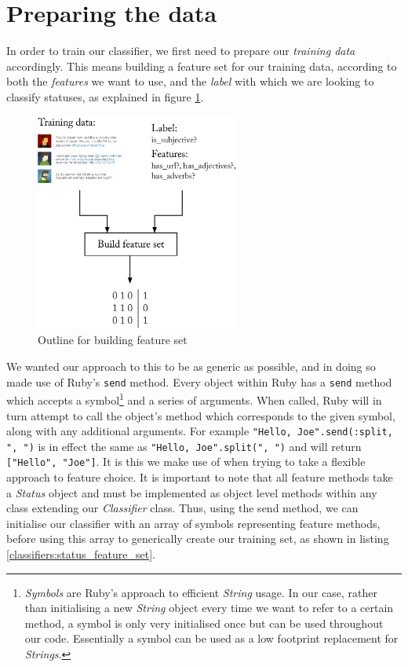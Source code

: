\section{Preparing the data}
\label{classifiers:preparing_data}

In order to train our classifier, we first need to prepare our \emph{training data} accordingly. This means building a feature set for our training data, according to both the \emph{features} we want to use, and the \emph{label} with which we are looking to classify statuses, as explained in figure \ref{fig:building_feature_set}.

\begin{figure}[h!]
	\caption{Outline for building feature set}
	\label{fig:building_feature_set}
	\centering
		\includegraphics[width=0.6\textwidth]{figures/build_training_data.eps}
\end{figure}

We wanted our approach to this to be as generic as possible, and in doing so made use of Ruby's \texttt{send} method. Every object within Ruby has a \texttt{send} method which accepts a symbol\footnote{\emph{Symbols} are Ruby's approach to efficient \emph{String} usage. In our case, rather than initialising a new \emph{String} object every time we want to refer to a certain method, a symbol is only very initialised once but can be used throughout our code. Essentially a symbol can be used as a low footprint replacement for \emph{Strings}.} and a series of arguments. When called, Ruby will in turn attempt to call the object's method which corresponds to the given symbol, along with any additional arguments. For example \texttt{"Hello, Joe".send(:split, ", ")} is in effect the same as \texttt{"Hello, Joe".split(", ")} and will return \texttt{["Hello", "Joe"]}. It is this we make use of when trying to take a flexible approach to feature choice. It is important to note that all feature methods take a \emph{Status} object and must be implemented as object level methods within any class extending our \emph{Classifier} class. Thus, using the send method, we can initialise our classifier with an array of symbols representing feature methods, before using this array to generically create our training set, as shown in listing \ref{classifiers:status_feature_set}.

